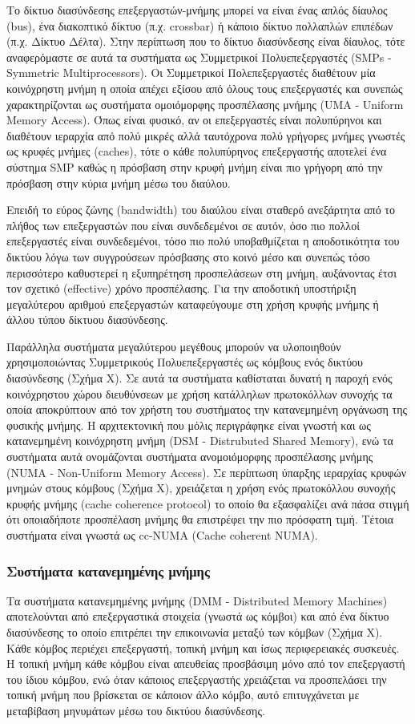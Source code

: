 Το δίκτυο διασύνδεσης επεξεργαστών-μνήμης μπορεί να είναι ένας απλός δίαυλος (bus), ένα διακοπτικό δίκτυο (π.χ. crossbar) ή κάποιο δίκτυο πολλαπλών επιπέδων (π.χ. Δίκτυο Δέλτα). Στην περίπτωση που το δίκτυο διασύνδεσης είναι δίαυλος, τότε αναφερόμαστε σε αυτά τα συστήματα ως Συμμετρικοί Πολυεπεξεργαστές (SMPs - Symmetric Multiprocessors). Οι Συμμετρικοί Πολεπεξεργαστές διαθέτουν μία κοινόχρηστη μνήμη η οποία απέχει εξίσου από όλους τους επεξεργαστές και συνεπώς χαρακτηρίζονται ως συστήματα ομοιόμορφης προσπέλασης μνήμης (UMA - Uniform Memory Access). Όπως είναι φυσικό, αν οι επεξεργαστές είναι πολυπύρηνοι και διαθέτουν ιεραρχία από πολύ μικρές αλλά ταυτόχρονα πολύ γρήγορες μνήμες γνωστές ως κρυφές μνήμες (caches), τότε ο κάθε πολυπύρηνος επεξεργαστής αποτελεί ένα σύστημα SMP καθώς η πρόσβαση στην κρυφή μνήμη είναι πιο γρήγορη από την πρόσβαση στην κύρια μνήμη μέσω του διαύλου.

Επειδή το εύρος ζώνης (bandwidth) του διαύλου είναι σταθερό ανεξάρτητα από το πλήθος των επεξεργαστών που είναι συνδεδεμένοι σε αυτόν, όσο πιο πολλοί επεξεργαστές είναι συνδεδεμένοι, τόσο πιο πολύ υποβαθμίζεται η αποδοτικότητα του δικτύου λόγω των συγγρούσεων πρόσβασης στο κοινό μέσο και συνεπώς τόσο περισσότερο καθυστερεί η εξυπηρέτηση προσπελάσεων στη μνήμη, αυξάνοντας έτσι τον σχετικό (effective) χρόνο προσπέλασης. Για την αποδοτική υποστήριξη μεγαλύτερου αριθμού επεξεργαστών καταφεύγουμε στη χρήση κρυφής μνήμης ή άλλου τύπου δίκτυου διασύνδεσης.

Παράλληλα συστήματα μεγαλύτερου μεγέθους μπορούν να υλοποιηθούν χρησιμοποιώντας Συμμετρικούς Πολυεπεξεργαστές ως κόμβους ενός δικτύου διασύνδεσης (Σχήμα Χ). Σε αυτά τα συστήματα καθίσταται δυνατή η παροχή ενός κοινόχρηστου χώρου διευθύνσεων με χρήση κατάλληλων πρωτοκόλλων συνοχής τα οποία αποκρύπτουν από τον χρήστη του συστήματος την κατανεμημένη οργάνωση της φυσικής μνήμης. Η αρχιτεκτονική που μόλις περιγράφηκε είναι γνωστή και ως κατανεμημένη κοινόχρηστη μνήμη (DSM - Distrubuted Shared Memory), ενώ τα συστήματα αυτά ονομάζονται συστήματα ανομοιόμορφης προσπέλασης μνήμης (NUMA - Non-Uniform Memory Access). Σε περίπτωση ύπαρξης ιεραρχίας κρυφών μνημών στους κόμβους (Σχήμα Χ), χρειάζεται η χρήση ενός πρωτοκόλλου συνοχής κρυφής μνήμης (cache coherence protocol) το οποίο θα εξασφαλίζει ανά πάσα στιγμή ότι οποιαδήποτε προσπέλαση μνήμης θα επιστρέφει την πιο πρόσφατη τιμή. Τέτοια συστήματα είναι γνωστά ως cc-NUMA (Cache coherent NUMA).

\subsubsection{Συστήματα κατανεμημένης μνήμης}
Τα συστήματα κατανεμημένης μνήμης (DMM - Distributed Memory Machines) αποτελούνται από επεξεργαστικά στοιχεία (γνωστά ως κόμβοι) και από ένα δίκτυο διασύνδεσης το οποίο επιτρέπει την επικοινωνία μεταξύ των κόμβων (Σχήμα Χ). Κάθε κόμβος περιέχει επεξεργαστή, τοπική μνήμη και ίσως περιφερειακές συσκευές. Η τοπική μνήμη κάθε κόμβου είναι απευθείας προσβάσιμη μόνο από τον επεξεργαστή του ίδιου κόμβου, ενώ όταν κάποιος επεξεργαστής χρειάζεται να προσπελάσει την τοπική μνήμη που βρίσκεται σε κάποιον άλλο κόμβο, αυτό επιτυγχάνεται με μεταβίβαση μηνυμάτων μέσω του δικτύου διασύνδεσης. 

